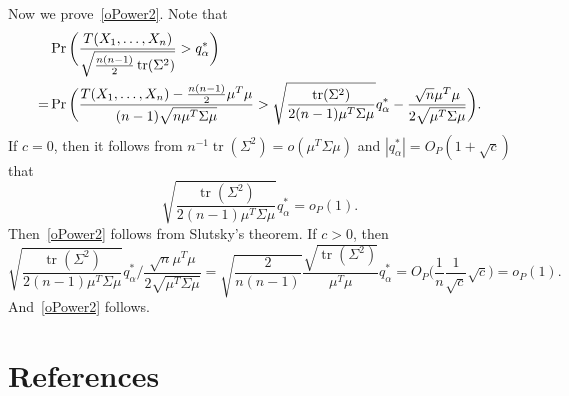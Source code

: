 \documentclass[3p]{elsarticle}
\DeclareMathOperator{\mytr}{tr}
\theoremstyle{plain}
\theoremstyle{definition}
\theoremstyle{remark}
\begin{document}
Now we prove~\eqref{oPower2}.
    Note that
    \begin{align}
        &\Pr\bigg(\frac{T( X_1,\ldots, X_n)}{\sqrt{\frac{n(n-1)}{2}\mytr(\Sigma^2)}}>q_{\alpha}^* \bigg)\nonumber\\
            =&
            \Pr\bigg(\frac{T( X_1,\ldots, X_n)-\frac{n(n-1)}{2}\mu^T\mu}{(n-1)\sqrt{ n \mu^T\Sigma\mu}}>
            \sqrt{\frac{\mytr(\Sigma^2)}{2(n-1)\mu^T\Sigma\mu}}q_{\alpha}^*-\frac{\sqrt{n}\mu^T\mu}{{2}\sqrt{  \mu^T\Sigma\mu}} \bigg).
        \notag
    \end{align}
    If $c=0$, then it follows from $n^{-1}\mytr(\Sigma^2)=o(\mu^T \Sigma \mu)$ and $|q_{\alpha}^*|=O_P(1+\sqrt{c})$ that
    $$
    \sqrt{\frac{\mytr(\Sigma^2)}{2(n-1)\mu^T\Sigma\mu}}q_{\alpha}^*=o_P(1).
    $$
    Then~\eqref{oPower2} follows from Slutsky's theorem.
    If $c>0$, then
    $$
    {
        \sqrt{\frac{\mytr(\Sigma^2)}{2(n-1)\mu^T\Sigma\mu}}q_{\alpha}^*
    }\bigg/{
        \frac{\sqrt{n}\mu^T\mu}{{2}\sqrt{  \mu^T\Sigma\mu}} 
    }
    =\sqrt{\frac{2}{n(n-1)}}\frac{\sqrt{\mytr(\Sigma^2)}}{\mu^T \mu} q_{\alpha}^*
    =O_P\Big(\frac{1}{n}\frac{1}{\sqrt{c}}\sqrt{c}\Big)=o_P(1).
    $$
    And~\eqref{oPower2} follows.






\section*{References}

\end{document}
